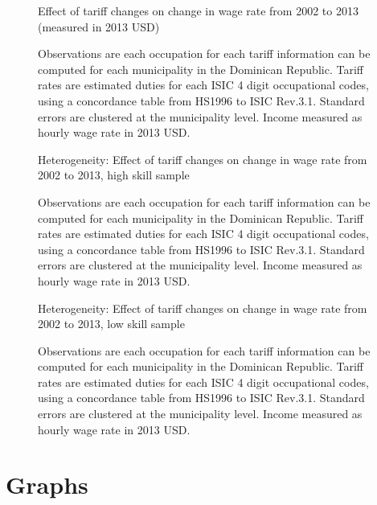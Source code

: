 \documentclass[12pt]{article}
\begin{document}
\begin{landscape}
\begin{figure}[H]
\begin{center}
Effect of tariff changes on change in wage rate from 2002 to 2013 (measured in 2013 USD)

\caption{\label{fig:Table2}}
\end{center}
Observations are each occupation for each tariff information can be computed for each municipality 
in the Dominican Republic. Tariff rates are estimated duties for each ISIC 4 %
digit occupational codes,
using a concordance table from HS1996 to ISIC Rev.3.1. Standard errors are clustered at the 
municipality level. Income measured as hourly wage rate in 2013 USD.
\end{figure}

\begin{figure}[H]
\begin{center}
Heterogeneity: Effect of tariff changes on change in wage rate from 2002 to 2013, high skill sample

\caption{\label{fig:Table4}}
\end{center}
Observations are each occupation for each tariff information can be computed for each municipality 
in the Dominican Republic. Tariff rates are estimated duties for each ISIC 4 %
digit occupational codes,
using a concordance table from HS1996 to ISIC Rev.3.1. Standard errors are clustered at the 
municipality level. Income measured as hourly wage rate in 2013 USD.
\end{figure}

\begin{figure}[H]
\begin{center}
Heterogeneity: Effect of tariff changes on change in wage rate from 2002 to 2013, low skill sample

\caption{\label{fig:Table5}}
\end{center}
Observations are each occupation for each tariff information can be computed for each municipality 
in the Dominican Republic. Tariff rates are estimated duties for each ISIC 4 %
digit occupational codes,
using a concordance table from HS1996 to ISIC Rev.3.1. Standard errors are clustered at the 
municipality level. Income measured as hourly wage rate in 2013 USD.
\end{figure}
\end{landscape}

\section{Graphs}
\label{sec:Graphs}
\end{document}
